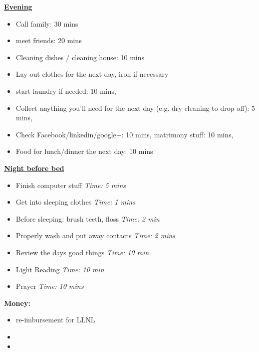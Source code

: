 \documentclass[serif, mathserif, final]{beamer}
\newcommand{\timeEst}[1]{\textit{Time:} \textit{#1}}
\begin{document}
{  \underline{\textbf{Evening}}
  \begin{itemize}
    \tiny \item \tiny Call family: 30 mins
  \item \tiny meet friends: 20 mins
  \item \tiny Cleaning dishes / cleaning house: 10 mins
  \item \tiny Lay out clothes for the next day, iron if necessary
  \item \tiny start laundry if needed: 10 mins,
  \item \tiny Collect anything you’ll need for the next day (e.g. dry cleaning to drop off): 5 mins,
  \item \tiny Check Facebook/linkedin/google+: 10 mins, matrimony stuff: 10 mins,
  \item \tiny Food for lunch/dinner the next day: 10 mins
  \end{itemize}

  \underline{\textbf{Night before bed}}
  \begin{itemize}
    \tiny \item \tiny Finish computer stuff \timeEst{5 mins}
  \item \tiny Get into sleeping clothes \timeEst{1 mins}
  \item \tiny Before sleeping: brush teeth, floss \timeEst{ 2 min}
  \item \tiny Properly wash and put away contacts \timeEst{ 2 mins}
  \item \tiny Review the days good things \timeEst{ 10 min}
  \item \tiny Light Reading \timeEst{ 10 min}
  \item \tiny Prayer \timeEst{10 mins}
  \end{itemize} 
  \newpage
  
  \textbf{Money:}\\ 
  \begin{itemize} 
    \tiny \item \tiny re-imbursement for LLNL 
  \item \tiny 
  \item \tiny 
  \end{itemize} 

}
\end{document}
